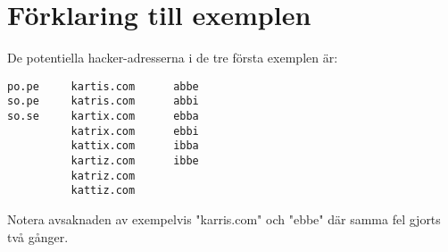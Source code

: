 \section*{Förklaring till exemplen}

De potentiella hacker-adresserna i de tre första exemplen är:
\begin{verbatim}
po.pe     kartis.com      abbe
so.pe     katris.com      abbi
so.se     kartix.com      ebba
          katrix.com      ebbi
          kattix.com      ibba
          kartiz.com      ibbe
          katriz.com
          kattiz.com
\end{verbatim}
Notera avsaknaden av exempelvis "karris.com" och "ebbe" där samma fel gjorts två gånger.

